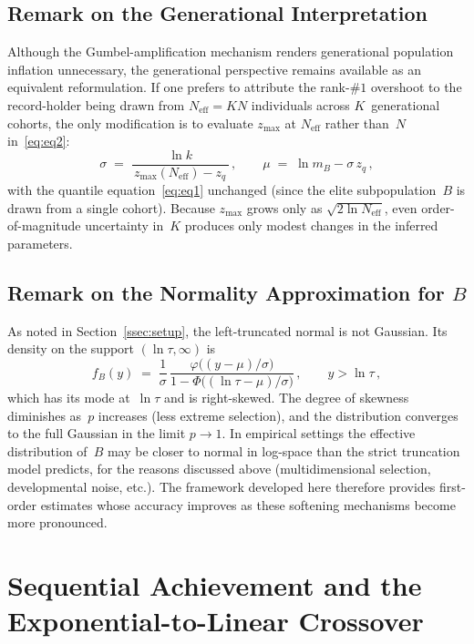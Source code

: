 \documentclass{article}
\begin{document}
\subsection{Remark on the Generational Interpretation}\label{ssec:generations}

Although the Gumbel-amplification mechanism renders generational population
inflation unnecessary, the generational perspective remains available as an
equivalent reformulation. If one prefers to attribute the rank-$\#1$
overshoot to the record-holder being drawn from $N_{\mathrm{eff}} = K N$
individuals across $K$~generational cohorts, the only modification is to
evaluate $z_{\max}$ at $N_{\mathrm{eff}}$ rather than~$N$
in~\eqref{eq:eq2}:
\begin{equation}\label{eq:sigma-gen}
  \sigma
  \;=\;
  \frac{\ln k}
       {\,z_{\max}(N_{\mathrm{eff}}) - z_q\,}\,,
  \qquad
  \mu
  \;=\;
  \ln m_B - \sigma\, z_q\,,
\end{equation}
with the quantile equation~\eqref{eq:eq1} unchanged (since the elite
subpopulation~$B$ is drawn from a single cohort). Because $z_{\max}$ grows
only as $\sqrt{2\ln N_{\mathrm{eff}}}$, even order-of-magnitude uncertainty
in~$K$ produces only modest changes in the inferred parameters.

\subsection{Remark on the Normality Approximation for $B$}
\label{ssec:normality}

As noted in Section~\ref{ssec:setup}, the left-truncated normal is not
Gaussian. Its density on the support $(\ln\tau,\infty)$ is
\[
  f_{B}(y)
  \;=\;
  \frac{1}{\sigma}\,
  \frac{\varphi\!\bigl((y-\mu)/\sigma\bigr)}
       {1 - \Phi\!\bigl((\ln\tau - \mu)/\sigma\bigr)}\,,
  \qquad y > \ln\tau\,,
\]
which has its mode at~$\ln\tau$ and is right-skewed. The degree of skewness
diminishes as~$p$ increases (less extreme selection), and the distribution
converges to the full Gaussian in the limit $p \to 1$. In empirical
settings the effective distribution of~$B$ may be closer to normal in
log-space than the strict truncation model predicts, for the reasons
discussed above (multidimensional selection, developmental noise, etc.).
The framework developed here therefore provides first-order estimates whose
accuracy improves as these softening mechanisms become more pronounced.



\section[Sequential Achievement and the Exponential-to-Linear Crossover]{Sequential Achievement and the\\ Exponential-to-Linear Crossover}\label{sec:completion}
\end{document}
